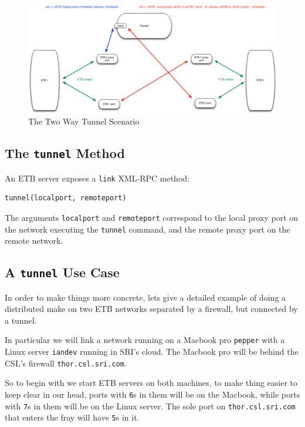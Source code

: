\documentclass{article}
\begin{document}
\begin{figure}
\begin{center}
\includegraphics[scale=.30]{images/2waytunnel}
\caption{The Two Way Tunnel Scenario}\label{fig:2waytunnel}
\end{center}
\end{figure}

\subsection{The {\tt tunnel} Method}


An ETB server exposes a {\tt link} XML-RPC method:
\begin{verbatim}
tunnel(localport, remoteport)
\end{verbatim}
The arguments {\tt localport} and {\tt remoteport} correspond to 
the local proxy port on the network executing the  {\tt tunnel}
command, and the remote proxy port on the remote network.


\subsection{A {\tt tunnel} Use Case}

In order to make things more concrete, lets give a detailed 
example of doing a distributed make on two ETB networks
separated by a firewall, but connected by a tunnel.

In particular we will link a network running on a Macbook pro
{\tt pepper} with a Linux server {\tt iandev} running in SRI's cloud. 
The Macbook pro will be behind the CSL's firewall {\tt thor.csl.sri.com}.


So to begin with we start ETB servers on both machines, to make thing easier to
keep clear in our head, ports with {\tt 6}s in them will be on the Macbook,
while ports with {\tt 7}s in them will be on the Linux server. The sole
port on {\tt thor.csl.sri.com} that enters the fray will have {\tt 5}s in it.
\end{document}
